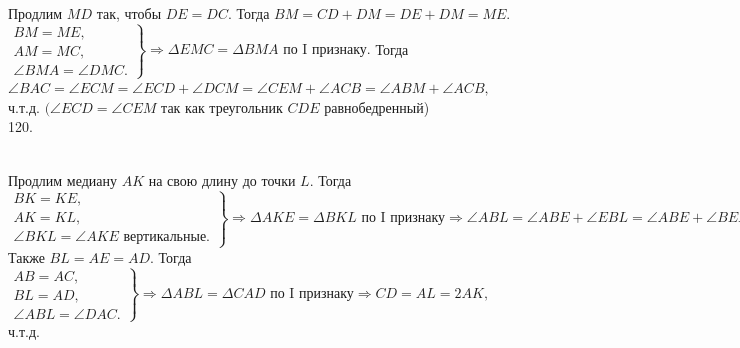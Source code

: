 \documentclass[12pt]{article}
\begin{document}
Продлим $MD$ так, чтобы $DE=DC.$ Тогда $BM=CD+DM=DE+DM=ME.$\\ $\left.\begin{array}{l}BM=ME,\\
AM=MC,\\
\angle BMA=\angle DMC. \end{array}\right\}\Rightarrow \Delta EMC=\Delta BMA\text{ по I признаку.}$ Тогда
$\angle BAC=\angle ECM=\angle ECD+\angle DCM=\angle CEM+\angle ACB=\angle ABM+\angle ACB,$ ч.т.д. $(\angle ECD=\angle CEM$ так как треугольник $CDE$ равнобедренный)\\
120. \begin{figure}[ht!]
\end{figure}\\
Продлим медиану $AK$ на свою длину до точки $L.$ Тогда $\left.\begin{array}{l}BK=KE,\\
AK=KL,\\
\angle BKL=\angle AKE\text{ вертикальные.} \end{array}\right\}\Rightarrow \Delta AKE=\Delta BKL\text{ по I признаку}\Rightarrow
\angle ABL=\angle ABE+\angle EBL=\angle ABE+\angle BEA=\angle DAC.$ Также  $BL=AE=AD.$ Тогда
$\left.\begin{array}{l}AB=AC,\\
BL=AD,\\
\angle ABL=\angle DAC. \end{array}\right\}\Rightarrow \Delta ABL=\Delta CAD\text{ по I признаку}\Rightarrow CD=AL=2AK,$ ч.т.д.\newpage\noindent
\end{document}
